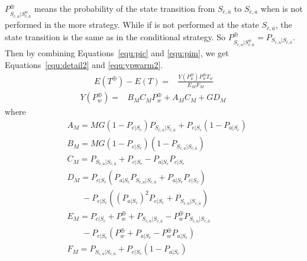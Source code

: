 
$P_{S_{\bar{c}, a}|S_{\bar{c},\bar{a}}^{\bar{w}}}^{\oplus}$ means the probability of the state transition from $S_{\bar{c}, \bar{a}}$ to $S_{\bar{c}, a}$ when {\vwarm} is not performed in the more {\vwarm} strategy. 
  While if {\vwarm} is not performed at the state $S_{\bar{c},\bar{a}}$, the state transition is the same as in the conditional {\vwarm} strategy.
So $P_{S_{\bar{c}, a}|S_{\bar{c},\bar{a}}^{\bar{w}}}^{\oplus} = P_{S_{\bar{c}, a}|S_{\bar{c},\bar{a}}}$.
Then by combining Equations~\ref{equ:pic} and \ref{equ:pim}, we get Equations~\ref{equ:detail2} and \ref{equ:ypwarm2}.
\begin{equation}
\label{equ:detail2}
\begin{split}
E(T^{\oplus}) - E(T) = &\frac{Y(P_{w}^{\oplus})P_{w}^{\oplus}T_{w}}{E_{M} F_{M}}
\end{split}\end{equation}
\begin{equation}
\label{equ:ypwarm2}
\begin{split}
Y(P_{w}^{\oplus}) = &B_{M}C_{M}P_{w}^{\oplus}+A_{M}C_{M}+GD_{M} \,
\end{split}\end{equation}
where
\begin{equation*}
\begin{split}
&A_{M}= MG(1-P_{e|S_{c}})P_{S_{\bar{c}, a}|S_{\bar{c},\bar{a}}}+P_{e|S_{c}}(1-P_{a|S_{c}})\\
&B_{M}=MG(1-P_{e|S_{c}})(1-P_{S_{\bar{c}, a}|S_{\bar{c},\bar{a}}})\\
&C_{M}=P_{S_{\bar{c}, a}|S_{\bar{c},\bar{a}}}+P_{e|S_{c}}-P_{a|S_{c}}P_{e|S_{c}}\\
&D_{M}=P_{e|S_{c}}(P_{a|S_{c}}P_{S_{\bar{c}, a}|S_{\bar{c},\bar{a}}}+P_{a|S_{c}}P_{e|S_{c}}) \\
& \ \ \ \ \ \ \ \ -P_{e|S_{c}}((P_{a|S_{c}})^2P_{e|S_{c}}+P_{S_{\bar{c}, a}|S_{\bar{c},\bar{a}}})\\
&E_{M}=P_{e|S_{c}}+P_{w}^{\oplus}+P_{S_{\bar{c}, a}|S_{\bar{c},\bar{a}}}-P_{w}^{\oplus}P_{S_{\bar{c}, a}|S_{\bar{c},\bar{a}}} \\& \ \ \ \ \ \ \ \ -P_{e|S_{c}}(P_{w}^{\oplus}+P_{a|S_{c}}-P_{w}^{\oplus}P_{a|S_{c}})\\
&F_{M}=P_{S_{\bar{c}, a}|S_{\bar{c},\bar{a}}}+P_{e|S_{c}}(1-P_{a|S_{c}})
\end{split}\end{equation*}

